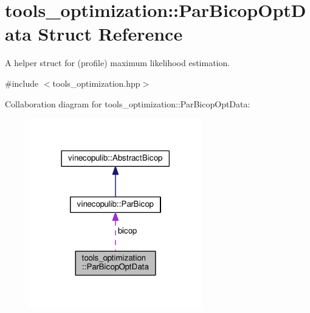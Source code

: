 \hypertarget{structtools__optimization_1_1_par_bicop_opt_data}{}\section{tools\+\_\+optimization\+:\+:Par\+Bicop\+Opt\+Data Struct Reference}
\label{structtools__optimization_1_1_par_bicop_opt_data}


A helper struct for (profile) maximum likelihood estimation.  




{\ttfamily \#include $<$tools\+\_\+optimization.\+hpp$>$}



Collaboration diagram for tools\+\_\+optimization\+:\+:Par\+Bicop\+Opt\+Data\+:
\nopagebreak
\begin{figure}[H]
\begin{center}
\leavevmode
\includegraphics[width=213pt]{structtools__optimization_1_1_par_bicop_opt_data__coll__graph}
\end{center}
\end{figure}
